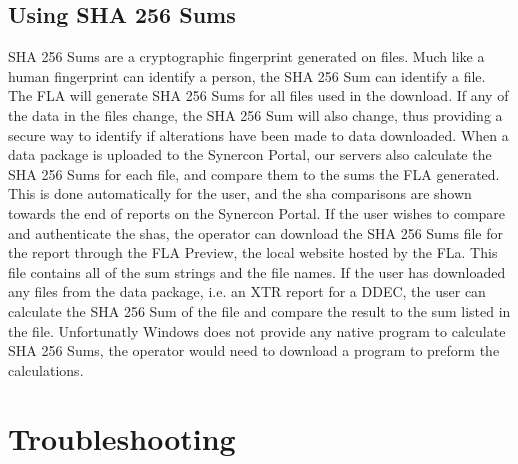 \documentclass[11pt]{article}
\begin{document}
\subsection{Using SHA 256 Sums}
\label{subsec:using_shas}
SHA 256 Sums are a cryptographic fingerprint generated on files. Much like a human fingerprint can identify a person, the SHA 256 Sum can identify a file. The FLA will generate SHA 256 Sums for all files used in the download. If any of the data in the files change, the SHA 256 Sum will also change, thus providing a secure way to identify if alterations have been made to data downloaded. When a data package is uploaded to the Synercon Portal, our servers also calculate the SHA 256 Sums for each file, and compare them to the sums the FLA generated. This is done automatically for the user, and the sha comparisons are shown towards the end of reports on the Synercon Portal. If the user wishes to compare and authenticate the shas, the operator can download the SHA 256 Sums file for the report through the FLA Preview, the local website hosted by the FLa. This file contains all of the sum strings and the file names. If the user has downloaded any files from the data package, i.e. an XTR report for a DDEC, the user can calculate the SHA 256 Sum of the file and compare the result to the sum listed in the file. Unfortunatly Windows does not provide any native program to calculate SHA 256 Sums, the operator would need to download a program to preform the calculations.

\section{Troubleshooting}
\end{document}
